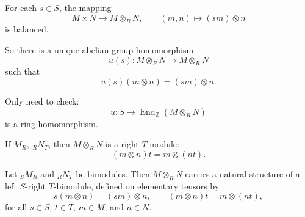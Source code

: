 For each \(s \in S\), the mapping
\[
    M \times N \longrightarrow M \otimes_R N,
    \qquad
    (m,n) \longmapsto (sm)\otimes n
\]
is balanced.

So there is a unique abelian group homomorphism
\[
    u(s): M \otimes_R N \longrightarrow M \otimes_R N
\]
such that
\[
    u(s)(m\otimes n)=(sm)\otimes n.
\]

Only need to check:
\[
    u:S\longrightarrow \operatorname{End}_{\mathbb Z}(M\otimes_R N)
\]
is a ring homomorphism.

If \(M_R,\ {}_R N_T\), then \(M\otimes_R N\) is a right \(T\)-module:
\[
    (m\otimes n)t = m\otimes (nt).
\]

\begin{lemma}
    Let ${}_S M_R$ and ${}_R N_T$ be bimodules. Then $M \otimes_R N$ carries a natural structure of a left $S$-right $T$-bimodule, defined on elementary tensors by
    \[
        s(m\otimes n)=(sm)\otimes n,
        \qquad
        (m\otimes n)t=m\otimes (nt),
    \]
    for all $s\in S$, $t\in T$, $m\in M$, and $n\in N$.
\end{lemma}

